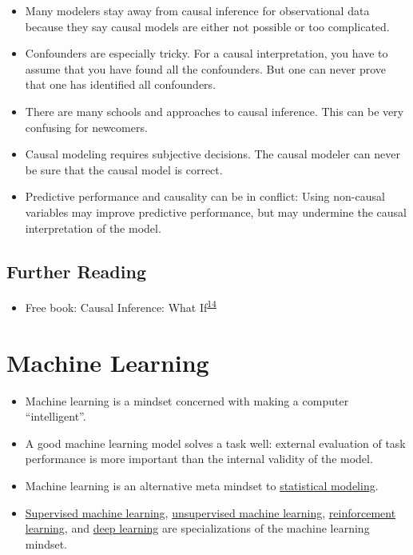 \documentclass[
  10pt,
]{scrbook}
\providecommand{\tightlist}{%
  \setlength{\itemsep}{0pt}\setlength{\parskip}{0pt}}
\begin{document}
\begin{itemize}
\tightlist
\item
  Many modelers stay away from causal inference for observational data because they say causal models are either not possible or too complicated.
\item
  Confounders are especially tricky. For a causal interpretation, you have to assume that you have found all the confounders. But one can never prove that one has identified all confounders.
\item
  There are many schools and approaches to causal inference. This can be very confusing for newcomers.
\item
  Causal modeling requires subjective decisions. The causal modeler can never be sure that the causal model is correct.
\item
  Predictive performance and causality can be in conflict: Using non-causal variables may improve predictive performance, but may undermine the causal interpretation of the model.
\end{itemize}

\hypertarget{further-reading}{%
\section{Further Reading}\label{further-reading}}

\begin{itemize}
\tightlist
\item
  Free book: Causal Inference: What If\textsuperscript{\protect\hyperlink{ref-hernan2010causal}{14}}
\end{itemize}

\hypertarget{machine-learning}{%
\chapter{Machine Learning}\label{machine-learning}}

\begin{itemize}
\tightlist
\item
  Machine learning is a mindset concerned with making a computer ``intelligent''.
\item
  A good machine learning model solves a task well: external evaluation of task performance is more important than the internal validity of the model.
\item
  Machine learning is an alternative meta mindset to \protect\hyperlink{statistical-ml}{statistical modeling}.
\item
  \protect\hyperlink{supervised-ml}{Supervised machine learning}, \protect\hyperlink{unsupervised-ml}{unsupervised machine learning}, \protect\hyperlink{reinforcement-learning}{reinforcement learning}, and \protect\hyperlink{deep-learning}{deep learning} are specializations of the machine learning mindset.
\end{itemize}
\end{document}
